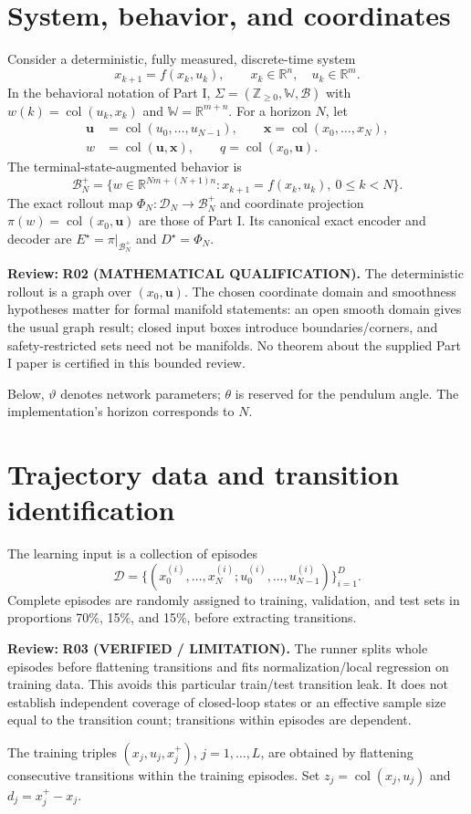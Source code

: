 \documentclass[11pt]{article}
\newcommand{\col}{\operatorname{col}}
\newcommand{\review}[1]{\par\noindent\textcolor{red!70!black}{\textbf{Review:} #1}\par}
\begin{document}
\section{System, behavior, and coordinates}
Consider a deterministic, fully measured, discrete-time system
\begin{equation}\label{eq:system}
x_{k+1}=f(x_k,u_k),\qquad x_k\in\mathbb R^n,\quad u_k\in\mathbb R^m.
\end{equation}
In the behavioral notation of Part I, $\Sigma=(\mathbb Z_{\geq0},\mathbb W,\mathcal B)$ with $w(k)=\col(u_k,x_k)$ and $\mathbb W=\mathbb R^{m+n}$. For a horizon $N$, let
\begin{align}
\mathbf u&=\col(u_0,\ldots,u_{N-1}),\qquad \mathbf x=\col(x_0,\ldots,x_N),\label{eq:sequences}\\
w&=\col(\mathbf u,\mathbf x),\qquad q=\col(x_0,\mathbf u).\label{eq:coordinates}
\end{align}
The terminal-state-augmented behavior is
\begin{equation}\label{eq:behavior}
\mathcal B_N^+=\{w\in\mathbb R^{Nm+(N+1)n}:x_{k+1}=f(x_k,u_k),\ 0\leq k<N\}.
\end{equation}
The exact rollout map $\Phi_N:\mathcal D_N\to\mathcal B_N^+$ and coordinate projection $\pi(w)=\col(x_0,\mathbf u)$ are those of Part I. Its canonical exact encoder and decoder are $E^\star=\pi|_{\mathcal B_N^+}$ and $D^\star=\Phi_N$.
\review{\textbf{R02 (MATHEMATICAL QUALIFICATION).} The deterministic rollout is a graph over $(x_0,\mathbf u)$. The chosen coordinate domain and smoothness hypotheses matter for formal manifold statements: an open smooth domain gives the usual graph result; closed input boxes introduce boundaries/corners, and safety-restricted sets need not be manifolds. No theorem about the supplied Part I paper is certified in this bounded review.}
 Below, $\vartheta$ denotes network parameters; $\theta$ is reserved for the pendulum angle. The implementation's horizon corresponds to $N$.

\section{Trajectory data and transition identification}
The learning input is a collection of episodes
\begin{equation}\label{eq:episodes}
\mathcal D=\{(x_0^{(i)},\ldots,x_N^{(i)};u_0^{(i)},\ldots,u_{N-1}^{(i)})\}_{i=1}^D.
\end{equation}
Complete episodes are randomly assigned to training, validation, and test sets in proportions 70\%, 15\%, and 15\%, before extracting transitions.
\review{\textbf{R03 (VERIFIED / LIMITATION).} The runner splits whole episodes before flattening transitions and fits normalization/local regression on training data. This avoids this particular train/test transition leak. It does not establish independent coverage of closed-loop states or an effective sample size equal to the transition count; transitions within episodes are dependent.}
 The training triples $(x_j,u_j,x_j^+)$, $j=1,\ldots,L$, are obtained by flattening consecutive transitions within the training episodes. Set $z_j=\col(x_j,u_j)$ and $d_j=x_j^+-x_j$.
\end{document}
